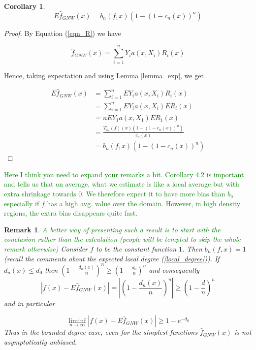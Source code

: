 \documentclass{article}
\newtheorem{corollary}[theorem]{Corollary}
\newtheorem{remark}[theorem]{Remark}
\newcommand\SB[1]{\textcolor{green}{#1}}
\begin{document}
\begin{corollary}
\label{expectation_comp}
\begin{equation*}
    E\hat{f}_{GNW}(x)=b_n(f,x)(1-(1-c_n(x))^n)
\end{equation*}
\end{corollary}
\begin{proof}

By Equation (\ref{eqn_R}) we have

\begin{equation*}
    \hat{f}_{GNW}(x)=\sum_{i=1}^n Y_ia(x,X_i)R_i(x)
\end{equation*}

Hence, taking expectation and using Lemma  \ref{lemma_exp}, we get 

\begin{equation*}
\begin{split}
    E\hat{f}_{GNW}(x)&=\sum_{i=1}^nEY_ia(x,X_i)R_i(x)\\
    &=\sum_{i=1}^nEY_ia(x,X_i)ER_i(x)\\
    &=nEY_1a(x,X_1)ER_1(x)\\
    &=\frac{T_{k_n}(f)(x)(1-(1-c_n(x))^n)}{c_n(x)}\\
    &=b_n(f,x)(1-(1-c_n(x))^n)
\end{split}
\end{equation*}

\end{proof}

\SB{Here I think you need to expand your remarks a bit. Corollary 4.2 is
  important and tells us that on average, what we estimate is like a local
  average but with extra shrinkage towards 0. We therefore expect it to have
  more bias than $b_n$ especially if $f$ has a high avg. value over the domain.
  However, in high density regions, the extra bias disappears quite fast. 
}
  
\begin{remark}
  \SB{A better way of presenting such a result is to start with the conclusion
    rather than the calculation (people will be tempted to skip the whole remark
  otherwise)}
  Consider $f$ to be the constant function $1$. Then $b_n(f,x)=1$ (recall the comments about the expected local degree (\ref{local_degree})). If $d_n(x)\leq d_0$ then $(1-\frac{d_n(x)}{n})^n\geq (1-\frac{d_0}{n})^n$ and consequently
\begin{equation*}
    |f(x)-E\hat{f}_{GNW}(x)|=|(1-\frac{d_n(x)}{n})^n|\geq (1-\frac{d}{n})^n
\end{equation*}
and in particular 

\begin{equation*}
    \liminf_{n\to\infty}{|f(x)-E\hat{f}_{GNW}(x)|}\geq 1-e^{-d_0}
\end{equation*}
Thus in the bounded degree case, even for the simplest functions $\hat{f}_{GNW}(x)$ is not asymptotically unbiased.

\end{remark}
\end{document}
